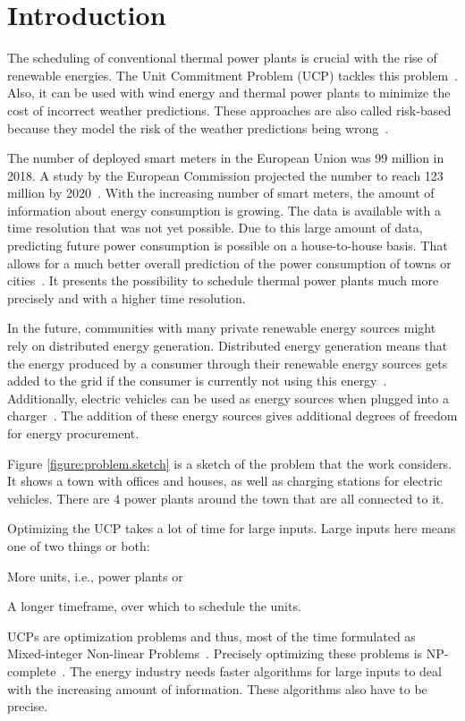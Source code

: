 \chapter{Introduction}

The scheduling of conventional thermal power plants is crucial with the rise of renewable energies.
The Unit Commitment Problem (UCP) tackles this problem~\cite{Banos2011}.
Also, it can be used with wind energy and thermal power plants to minimize the cost of incorrect weather predictions.
These approaches are also called risk-based because they model the risk of the weather predictions being wrong~\cite{Chen2008, Abujarad2017}.

The number of deployed smart meters in the European Union was 99 million in 2018.
A study by the European Commission projected the number to reach 123 million by 2020~\cite{Vlachogiannis2019}.
With the increasing number of smart meters, the amount of information about energy consumption is growing.
The data is available with a time resolution that was not yet possible.
Due to this large amount of data, predicting future power consumption is possible on a house-to-house basis.
That allows for a much better overall prediction of the power consumption of towns or cities~\cite{Aiello2016, Basu2013}.
It presents the possibility to schedule thermal power plants much more precisely and with a higher time resolution.

In the future, communities with many private renewable energy sources might rely on distributed energy generation.
Distributed energy generation means that the energy produced by a consumer through their renewable energy sources gets added to the grid if the consumer is currently not using this energy~\cite{Aiello2016}.
Additionally, electric vehicles can be used as energy sources when plugged into a charger~\cite{Zhang2016}.
The addition of these energy sources gives additional degrees of freedom for energy procurement.

Figure \ref{figure:problem.sketch} is a sketch of the problem that the work considers.
It shows a town with offices and houses, as well as charging stations for electric vehicles.
There are $4$ power plants around the town that are all connected to it.

Optimizing the UCP takes a lot of time for large inputs.
Large inputs here means one of two things or both:
\begin{enumerate*}[label=(\roman*)]
  \item More units, i.e., power plants or
  \item A longer timeframe, over which to schedule the units.
\end{enumerate*}
UCPs are optimization problems and thus, most of the time formulated as Mixed-integer Non-linear Problems~\cite{Baldick1995}.
Precisely optimizing these problems is NP-complete~\cite{Li2005, Bienstock1996}.
The energy industry needs faster algorithms for large inputs to deal with the increasing amount of information.
These algorithms also have to be precise.

